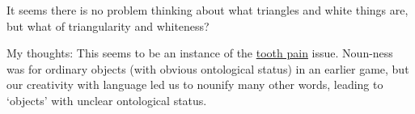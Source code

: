 It seems there is no problem thinking about what triangles and white things are, but what of triangularity and whiteness?

My thoughts: This seems to be an instance of the \href{doc/phil/Phil Situations/Tooth Pain|example}{tooth pain} issue. Noun-ness was for ordinary objects (with obvious ontological status) in an earlier game, but our creativity with language led us to nounify many other words, leading to `objects' with unclear ontological status.